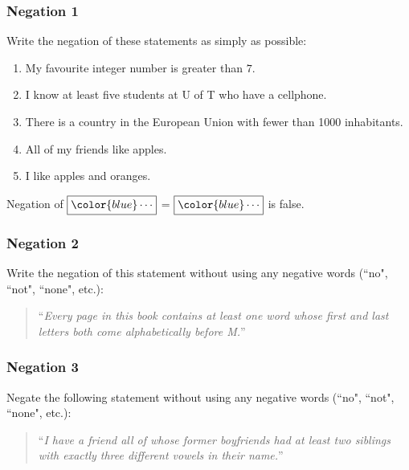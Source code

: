 \begin{frame}
	\frametitle{Negation 1}

	Write the negation of these statements as simply as possible:

	\begin{enumerate}
		\item My favourite integer number is greater than $7$.

		\item I know at least five students at U of T who have a cellphone.

		\item There is a country in the European Union with fewer than 1000 inhabitants.

		\item All of my friends like apples.

		\item I like apples and oranges.
	\end{enumerate}

	\vfill

	\begin{center}
		Negation of $\displaystyle \boxed{{\color{blue} \cdots}}$ \; = \; $\displaystyle
		\boxed{{\color{blue} \cdots}}$ is false.
	\end{center}
\end{frame}

\begin{frame}
	\frametitle{Negation 2}

	Write the negation of this statement without using any negative words (``no", ``not",
	``none", etc.):

	\begin{quote}
		``\emph{Every page in this book contains at least one word whose first and
		last letters both come alphabetically before M.}''
	\end{quote}
\end{frame}

\begin{frame}
	\frametitle{Negation 3}

	Negate the following statement without using any negative words (``no", ``not",
	``none", etc.):

	\begin{quote}
		``\emph{I have a friend all of whose former boyfriends had at least two
		siblings with exactly three different vowels in their name.}''
	\end{quote}
\end{frame}

